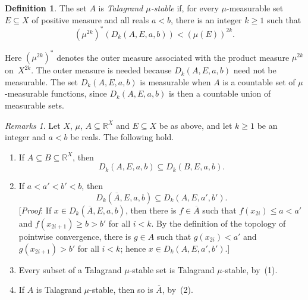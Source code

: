 \documentclass[psamsfonts]{amsart}
\theoremstyle{definition}
\newtheorem{defn}[thm]{Definition}
\theoremstyle{remark}
\newtheorem{rems}[thm]{Remarks}
\numberwithin{equation}{section}
\begin{document}
\begin{defn}
  \label{def:Talagrand-stable}
  The set $A$ is \emph{Talagrand $\mu$-stable} if, for every $\mu$-measurable set $E\subseteq X$ of positive measure and all reals $a<b$, there is an integer $k\geq 1$ such that
  \[
    (\mu^{2k})^*(D_k(A,E,a,b))<(\mu(E))^{2k}.
  \]
\end{defn}

Here $(\mu^{2k})^*$ denotes the outer measure associated with the product measure $\mu^{2k}$ on~$X^{2k}$.
The outer measure is needed because $D_k(A,E,a,b)$ need not be measurable.
The set $D_k(A,E,a,b)$ is measurable when $A$ is a countable set of $\mu$-measurable functions, since $D_k(A,E,a,b)$ is then a countable union of measurable sets.

\begin{rems}
  \label{rem:Talagrand-stability}
  Let $X$, $\mu$, $A\subseteq \mathbb{R}^X$ and $E\subseteq X$ be as above, and let $k\ge1$ be an integer and $a<b$ be reals.
  The following hold.
  \begin{enumerate}
  \item
    If $A\subseteq B\subseteq \mathbb{R}^X$, then
    \[
      D_k(A,E,a,b)\subseteq D_k(B,E,a,b).
    \]

  \item
    If $a<a'<b'<b$, then
    \[
      D_k(\overline{A},E,a,b)\subseteq D_k(A,E,a',b').
    \]
    [\emph{Proof}:
      If $x\in D_k(\overline{A},E,a,b)$, then there is $f\in\overline{A}$ such that $f(x_{2i})\leq a<a'$ and $f(x_{2i+1})\geq b>b'$ for all $i<k$.
      By the definition of the topology of pointwise convergence, there is $g\in A$ such that $g(x_{2i})<a'$ and $g(x_{2i+1})>b'$ for all $i<k$;
      hence $x\in D_k(A,E,a',b')$.]

  \item
    Every subset of a Talagrand $\mu$-stable set is Talagrand $\mu$-stable, by~(1).

  \item
    If $A$ is Talagrand $\mu$-stable, then so is $\overline{A}$, by~(2).
  \end{enumerate}
\end{rems}
\end{document}
